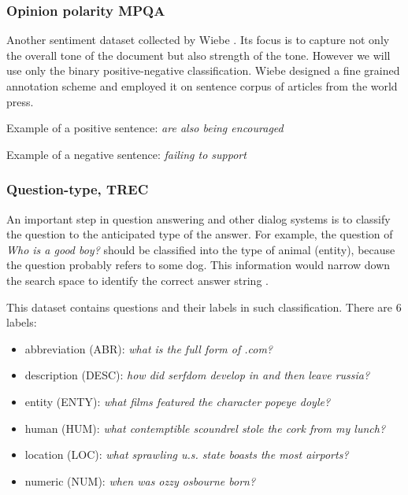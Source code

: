     \subsubsection{Opinion polarity MPQA}

    Another sentiment dataset collected by Wiebe \cite{wiebe2005annotating}.
    Its focus is to capture not only the overall tone of the document but also strength of the tone.
    However we will use only the binary positive-negative classification.
    Wiebe designed a fine grained annotation scheme and employed it on sentence corpus of articles from the world press.
    
    Example of a positive sentence:
    \emph{are also being encouraged}
    
    Example of a negative sentence:
    \emph{failing to support} 

    
    \subsubsection{Question-type, TREC}
    
    An important step in question answering and other dialog systems is to classify the  question to the anticipated type of the answer. 
    For example, the question of \emph{Who is a good boy?} should be classified into the type of animal (entity), because the question probably refers to some dog.  
    This information would narrow down the search space to identify the correct answer string \cite{huang2008question}. 
    
    This dataset contains questions and their labels in such classification.
    There are $6$ labels: 
    
    \begin{itemize}
        \item abbreviation (ABR): \emph{what is the full form of .com?}
        \item description (DESC): \emph{how did serfdom develop in and then leave russia?}
        \item entity (ENTY): \emph{what films featured the character popeye doyle?}
        \item human (HUM): \emph{what contemptible scoundrel stole the cork from my lunch?}
        \item location (LOC): \emph{what sprawling u.s. state boasts the most airports?}
        \item numeric (NUM): \emph{when was ozzy osbourne born?}
    \end{itemize}
    
